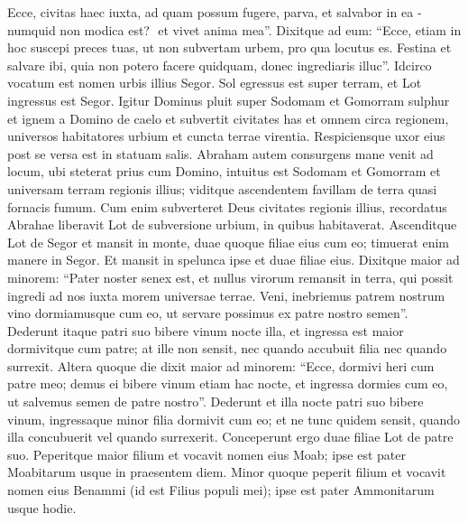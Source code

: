 \begin{biblechapter}
\verse Ecce, civitas haec iuxta, ad quam possum fugere, parva, et salvabor in ea ­ numquid non modica est? ­ et vivet anima mea”. 
\verse Dixitque ad eum: “Ecce, etiam in hoc suscepi preces tuas, ut non subvertam urbem, pro qua locutus es. 
\verse Festina et salvare ibi, quia non potero facere quidquam, donec ingrediaris illuc”. Idcirco vocatum est nomen urbis illius Segor. 
\verse Sol egressus est super terram, et Lot ingressus est Segor. 
\verse Igitur Dominus pluit super Sodomam et Gomorram sulphur et ignem a Domino de caelo  
\verse et subvertit civitates has et omnem circa regionem, universos habitatores urbium et cuncta terrae virentia. 
\verse Respiciensque uxor eius post se versa est in statuam salis. 
\verse Abraham autem consurgens mane venit ad locum, ubi steterat prius cum Domino, 
\verse intuitus est Sodomam et Gomorram et universam terram regionis illius; viditque ascendentem favillam de terra quasi fornacis fumum. 
\verse Cum enim subverteret Deus civitates regionis illius, recordatus Abrahae liberavit Lot de subversione urbium, in quibus habitaverat. 
\verse Ascenditque Lot de Segor et mansit in monte, duae quoque filiae eius cum eo; timuerat enim manere in Segor. Et mansit in spelunca ipse et duae filiae eius. 
\verse Dixitque maior ad minorem: “Pater noster senex est, et nullus virorum remansit in terra, qui possit ingredi ad nos iuxta morem universae terrae.  
\verse Veni, inebriemus patrem nostrum vino dormiamusque cum eo, ut servare possimus ex patre nostro semen”. 
\verse Dederunt itaque patri suo bibere vinum nocte illa, et ingressa est maior dormivitque cum patre; at ille non sensit, nec quando accubuit filia nec quando surrexit. 
\verse Altera quoque die dixit maior ad minorem: “Ecce, dormivi heri cum patre meo; demus ei bibere vinum etiam hac nocte, et ingressa dormies cum eo, ut salvemus semen de patre nostro”. 
\verse Dederunt et illa nocte patri suo bibere vinum, ingressaque minor filia dormivit cum eo; et ne tunc quidem sensit, quando illa concubuerit vel quando surrexerit.  
\verse Conceperunt ergo duae filiae Lot de patre suo. 
\verse Peperitque maior filium et vocavit nomen eius Moab; ipse est pater Moabitarum usque in praesentem diem.  
\verse Minor quoque peperit filium et vocavit nomen eius Benammi (id est Filius populi mei); ipse est pater Ammonitarum usque hodie. 
\end{biblechapter}

